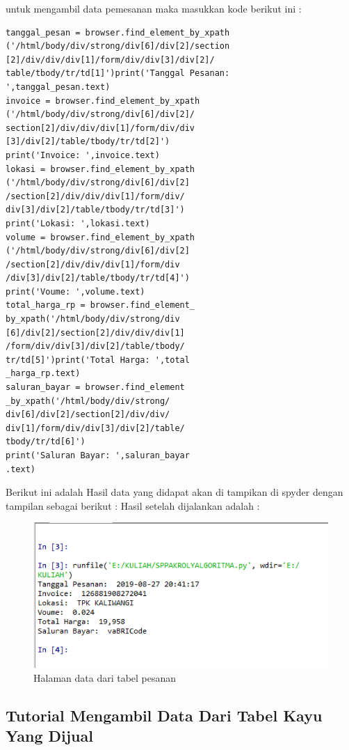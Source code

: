 untuk mengambil data pemesanan  maka masukkan kode berikut ini :
\begin{verbatim}
tanggal_pesan = browser.find_element_by_xpath
('/html/body/div/strong/div[6]/div[2]/section
[2]/div/div/div[1]/form/div/div[3]/div[2]/
table/tbody/tr/td[1]')print('Tanggal Pesanan:
',tanggal_pesan.text)
invoice = browser.find_element_by_xpath
('/html/body/div/strong/div[6]/div[2]/
section[2]/div/div/div[1]/form/div/div
[3]/div[2]/table/tbody/tr/td[2]')
print('Invoice: ',invoice.text)
lokasi = browser.find_element_by_xpath
('/html/body/div/strong/div[6]/div[2]
/section[2]/div/div/div[1]/form/div/
div[3]/div[2]/table/tbody/tr/td[3]')
print('Lokasi: ',lokasi.text)
volume = browser.find_element_by_xpath
('/html/body/div/strong/div[6]/div[2]
/section[2]/div/div/div[1]/form/div
/div[3]/div[2]/table/tbody/tr/td[4]')
print('Voume: ',volume.text)
total_harga_rp = browser.find_element_
by_xpath('/html/body/div/strong/div
[6]/div[2]/section[2]/div/div/div[1]
/form/div/div[3]/div[2]/table/tbody/
tr/td[5]')print('Total Harga: ',total
_harga_rp.text)
saluran_bayar = browser.find_element
_by_xpath('/html/body/div/strong/
div[6]/div[2]/section[2]/div/div/
div[1]/form/div/div[3]/div[2]/table/
tbody/tr/td[6]')
print('Saluran Bayar: ',saluran_bayar
.text)
\end{verbatim}

Berikut ini adalah Hasil data yang didapat 
akan di tampikan di spyder dengan tampilan sebagai berikut :
Hasil setelah dijalankan adalah :
\begin{figure}[h]
	\centering
	\includegraphics[scale=0.6]{figures/2tabelpesanan}
	\caption{Halaman data dari tabel pesanan}
\end{figure}

\newpage
\subsection{Tutorial Mengambil Data Dari Tabel Kayu Yang Dijual}


